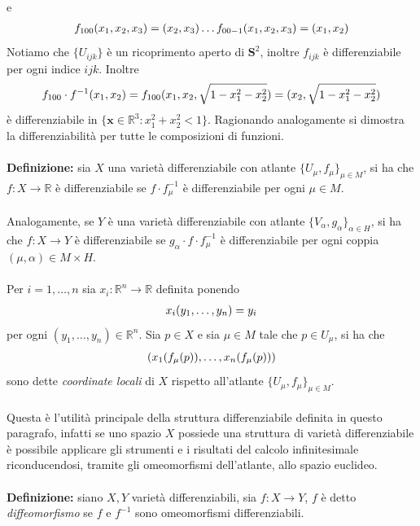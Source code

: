 \documentclass{article}
\begin{document}
e
\begin{gather}
    f_{100}(x_1, x_2, x_3) = (x_2, x_3) \dots f_{00-1}(x_1, x_2, x_3) = (x_1, x_2) \notag
\end{gather}
Notiamo che $\{ U_{ijk} \}$ è un ricoprimento aperto di $\mathbf{S}^2$, inoltre $f_{ijk}$ è differenziabile per ogni indice $ijk$. Inoltre
\begin{gather}
    f_{100} \cdot f^{-1}(x_1, x_2) = f_{100}(x_1, x_2, \sqrt{1 - x^2_1 - x^2_2}) = (x_2, \sqrt{1 - x^2_1 - x^2_2}) \notag
\end{gather}
è differenziabile in $\{ \mathbf{x} \in \mathbb{R}^3 : x^2_1 + x^2_2 < 1 \}$. Ragionando analogamente si dimostra la differenziabilità per tutte le composizioni di funzioni. \\ \\
\textbf{Definizione:} sia $X$ una varietà differenziabile con atlante $\{ U_\mu, f_\mu \}_{\mu \in M}$, si ha che $f : X \longrightarrow \mathbb{R}$ è differenziabile se $f \cdot f^{-1}_\mu$ è differenziabile per ogni $\mu \in M$. \\ \\
Analogamente, se $Y$ è una varietà differenziabile con atlante $\{ V_\alpha, g_\alpha \}_{\alpha \in H}$, si ha che $f : X \longrightarrow Y$ è differenziabile se $g_{\alpha} \cdot f \cdot f^{-1}_\mu$ è differenziabile per ogni coppia $(\mu, \alpha) \in M \times H$. \\ \\
Per $i = 1, \dots, n$ sia $x_i : \mathbb{R}^n \longrightarrow \mathbb{R}$ definita ponendo
\begin{gather}
    x_i(y_1, \dots, y_n) = y_i \notag
\end{gather}
per ogni $(y_1, \dots, y_n) \in \mathbb{R}^n$. Sia $p \in X$ e sia $\mu \in M$ tale che $p \in U_\mu$, si ha che
\begin{gather}
    (x_1(f_\mu(p)), \dots, x_n(f_\mu(p))) \notag
\end{gather}
sono dette \textit{coordinate locali} di $X$ rispetto all'atlante $\{ U_\mu, f_\mu \}_{\mu \in M}$. \\ \\
Questa è l'utilità principale della struttura differenziabile definita in questo paragrafo, infatti se uno spazio $X$ possiede una struttura di varietà differenziabile è possibile applicare gli strumenti e i risultati del calcolo infinitesimale riconducendosi, tramite gli omeomorfismi dell'atlante, allo spazio euclideo. \\ \\
\textbf{Definizione:} siano $X, Y$ varietà differenziabili, sia $f : X \longrightarrow Y$, $f$ è detto \textit{diffeomorfismo} se $f$ e $f^{-1}$ sono omeomorfismi differenziabili.
\end{document}
